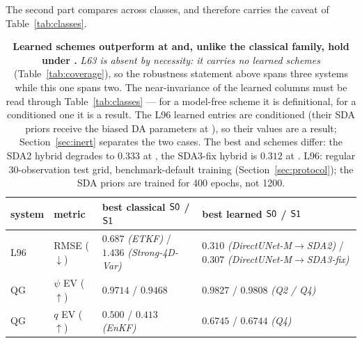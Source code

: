 The second part compares across classes, and therefore carries the caveat of
Table~\ref{tab:classes}.

\begin{table}[t]
\centering
\small
\begin{tabular}{@{}llll@{}}
\toprule
\textbf{system} & \textbf{metric} & \textbf{best classical} $\textsf{S0}$ / $\textsf{S1}$ & \textbf{best learned} $\textsf{S0}$ / $\textsf{S1}$ \\
\midrule
L96 & RMSE ($\downarrow$) & $0.687$ \emph{(ETKF)} / $1.436$ \emph{(Strong-4D-Var)} & $\mathbf{0.310}$ \emph{(DirectUNet-M$\to$SDA2)} / $\mathbf{0.307}$ \emph{(DirectUNet-M$\to$SDA3-fix)} \\
QG  & $\psi$ EV ($\uparrow$) & $0.9714$ / $0.9468$ & $\mathbf{0.9827}$ / $\mathbf{0.9808}$ \emph{(Q2 / Q4)} \\
QG  & $q$ EV ($\uparrow$) & $0.500$ / $0.413$ \emph{(EnKF)} & $\mathbf{0.6745}$ / $\mathbf{0.6744}$ \emph{(Q4)} \\
\bottomrule
\end{tabular}
\caption{\textbf{Learned schemes outperform at \Sz{} and, unlike the classical
family, hold under \So{}.} \emph{L63 is absent by necessity: it carries no
learned schemes} (Table~\ref{tab:coverage}), so the robustness statement above
spans three systems while this one spans two. The near-invariance of the learned
columns must be read through Table~\ref{tab:classes} --- for a model-free scheme
it is definitional, for a conditioned one it is a result. The L96 learned entries are
conditioned (their SDA priors receive the biased DA parameters at \So{}), so their
\So{} values are a result; Section~\ref{sec:inert} separates the two cases. The
best \Sz{} and \So{} schemes differ: the SDA2 hybrid degrades to $0.333$ at \So{},
the SDA3-fix hybrid is $0.312$ at \Sz{}. L96: regular 30-observation test grid,
benchmark-default training (Section~\ref{sec:protocol}); the SDA priors are
trained for 400 epochs, not 1200.}
\label{tab:overview-gap}
\end{table}

